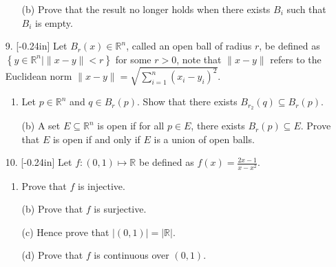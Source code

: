 \documentclass[letterpaper,12pt]{article}
\newcommand{\set}[1]{\left\{ #1 \right\}}
\theoremstyle{definition}
\begin{document}
\pagebreak
\begin{enumerate}
    \item[] \begin{enumerate}
        \item[(b)] Prove that the result no longer holds when there exists $B_i$ such that $B_i$ is empty.
    \end{enumerate}
\end{enumerate}
\pagebreak
\begin{enumerate}
    \item[9.] \reversemarginpar{}[-0.24in] 
 Let $B_r(x) \in \mathbb{R}^n$, called an open ball of radius $r$, be defined as $\set{y \in \mathbb{R}^n | \| x-y \| < r}$ for some $r > 0$, note that $\| x-y \|$ refers to the Euclidean norm $\| x-y \| = \sqrt{\sum_{i=1}^n (x_i - y_i)^2}$. \begin{enumerate}
        \item Let $p \in \mathbb{R}^n$ and $q \in B_r(p)$. Show that there exists $B_{r_2}(q) \subseteq B_r(p)$.
    \end{enumerate}
\end{enumerate}
\pagebreak
\begin{enumerate}
    \item[] \begin{enumerate}
        \item[(b)] A set $E \subseteq \mathbb{R}^n$ is open if for all $p \in E$, there exists $B_r(p) \subseteq E$. Prove that $E$ is open if and only if $E$ is a union of open balls.
    \end{enumerate}
\end{enumerate}
\pagebreak
\begin{enumerate}
    \item[10.] \reversemarginpar{}[-0.24in] 
    Let $f:(0,1) \mapsto \mathbb{R}$ be defined as $f(x) = \frac{2x-1}{x-x^2}$. \begin{enumerate}
        \item Prove that $f$ is injective.
    \end{enumerate}
\end{enumerate}
\pagebreak
\begin{enumerate}
    \item[] \begin{enumerate}
        \item[(b)] Prove that $f$ is surjective.
        \vspace{6in}
        \item[(c)] Hence prove that $|(0,1)|=|\mathbb{R}|$.
    \end{enumerate}
\end{enumerate}
\pagebreak
\begin{enumerate}
    \item[] \begin{enumerate}
        \item[(d)] Prove that $f$ is continuous over $(0,1)$.
    \end{enumerate}
\end{enumerate}
\end{document}
